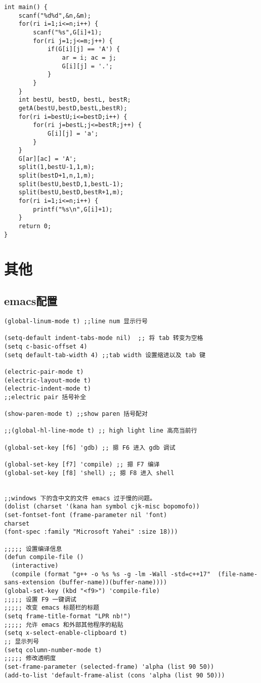\documentclass[UTF8]{ctexart}
\begin{document}
\begin{framed}
\begin{lstlisting}
int main() {
    scanf("%d%d",&n,&m);
    for(ri i=1;i<=n;i++) {
        scanf("%s",G[i]+1);
        for(ri j=1;j<=m;j++) {
            if(G[i][j] == 'A') {
                ar = i; ac = j;
                G[i][j] = '.';
            }
        }
    }
    int bestU, bestD, bestL, bestR;
    getA(bestU,bestD,bestL,bestR);
    for(ri i=bestU;i<=bestD;i++) {
        for(ri j=bestL;j<=bestR;j++) {
            G[i][j] = 'a';
        }
    }
    G[ar][ac] = 'A';
    split(1,bestU-1,1,m);
    split(bestD+1,n,1,m);
    split(bestU,bestD,1,bestL-1);
    split(bestU,bestD,bestR+1,m);
    for(ri i=1;i<=n;i++) {
        printf("%s\n",G[i]+1);
    }
    return 0;
}
\end{lstlisting}
\end{framed}

\newpage
\section{其他}

\subsection{emacs配置}

\begin{framed}
\begin{lstlisting}
(global-linum-mode t) ;;line num 显示行号

(setq-default indent-tabs-mode nil)  ;; 将 tab 转变为空格
(setq c-basic-offset 4)
(setq default-tab-width 4) ;;tab width 设置缩进以及 tab 键

(electric-pair-mode t)
(electric-layout-mode t)
(electric-indent-mode t)
;;electric pair 括号补全

(show-paren-mode t) ;;show paren 括号配对

;;(global-hl-line-mode t) ;; high light line 高亮当前行

(global-set-key [f6] 'gdb) ;; 摁 F6 进入 gdb 调试

(global-set-key [f7] 'compile) ;; 摁 F7 编译
(global-set-key [f8] 'shell) ;; 摁 F8 进入 shell


;;windows 下的含中文的文件 emacs 过于慢的问题。
(dolist (charset '(kana han symbol cjk-misc bopomofo))
(set-fontset-font (frame-parameter nil 'font)
charset
(font-spec :family "Microsoft Yahei" :size 18)))

;;;;; 设置编译信息
(defun compile-file ()
  (interactive)
  (compile (format "g++ -o %s %s -g -lm -Wall -std=c++17"  (file-name-sans-extension (buffer-name))(buffer-name))))
(global-set-key (kbd "<f9>") 'compile-file)
;;;;; 设置 F9 一键调试
;;;;; 改变 emacs 标题栏的标题
(setq frame-title-format "LPR nb!")
;;;;; 允许 emacs 和外部其他程序的粘贴
(setq x-select-enable-clipboard t)
;; 显示列号
(setq column-number-mode t)
;;;;; 修改透明度
(set-frame-parameter (selected-frame) 'alpha (list 90 50))
(add-to-list 'default-frame-alist (cons 'alpha (list 90 50)))
\end{lstlisting}
\end{framed}
\end{document}
